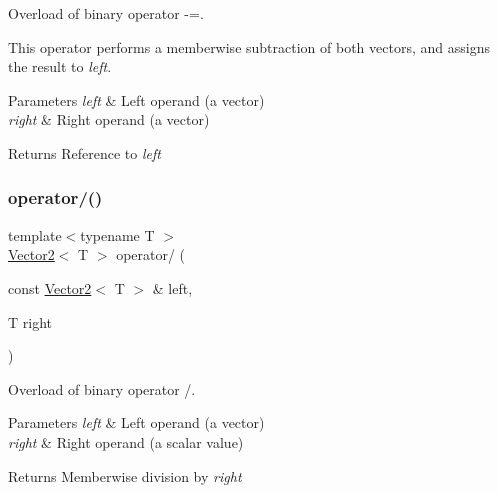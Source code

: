 Overload of binary operator -\/=. 

This operator performs a memberwise subtraction of both vectors, and assigns the result to {\itshape left}.


\begin{DoxyParams}{Parameters}
{\em left} & Left operand (a vector) \\
\hline
{\em right} & Right operand (a vector)\\
\hline
\end{DoxyParams}
\begin{DoxyReturn}{Returns}
Reference to {\itshape left} 
\end{DoxyReturn}
\mbox{\label{classsf_1_1_vector2_a7409dd89cb3aad6c3bc6622311107311}} 
\subsubsection{\texorpdfstring{operator/()}{operator/()}}
{\footnotesize\ttfamily template$<$typename T $>$ \\
\hyperlink{classsf_1_1_vector2}{Vector2}$<$ T $>$ operator/ (\begin{DoxyParamCaption}\item[{const \hyperlink{classsf_1_1_vector2}{Vector2}$<$ T $>$ \&}]{left,  }\item[{T}]{right }\end{DoxyParamCaption})\hspace{0.3cm}{\ttfamily [related]}}



Overload of binary operator /. 


\begin{DoxyParams}{Parameters}
{\em left} & Left operand (a vector) \\
\hline
{\em right} & Right operand (a scalar value)\\
\hline
\end{DoxyParams}
\begin{DoxyReturn}{Returns}
Memberwise division by {\itshape right} 
\end{DoxyReturn}
\mbox{\label{classsf_1_1_vector2_ac4d293c9dc7954ccfd5e373972f38b03}} 
